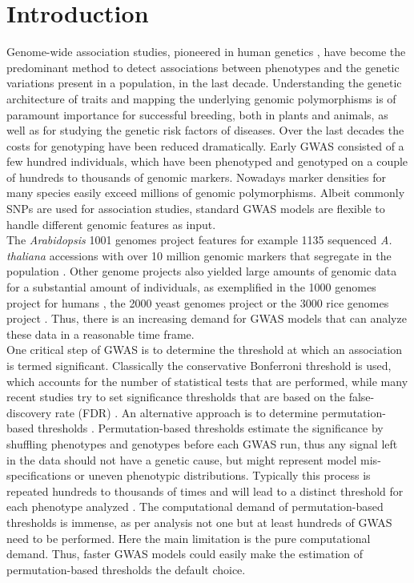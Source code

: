 \section{Introduction}
Genome-wide association studies, pioneered in human genetics \cite{Hirschhorn2005}, have
become the predominant method to detect associations between phenotypes and the genetic
variations present in a population, in the last decade. Understanding the genetic
architecture of traits and mapping the underlying genomic polymorphisms is of paramount
importance for successful breeding, both in plants and animals, as well as for studying
the genetic risk factors of diseases. Over the last decades the costs for genotyping have
been reduced dramatically. Early GWAS consisted of a few hundred individuals, which have
been phenotyped and genotyped on a couple of hundreds to thousands of genomic
markers. Nowadays marker densities for many species easily exceed millions of genomic
polymorphisms. Albeit commonly SNPs are used for association studies, standard GWAS models
are flexible to handle different genomic features as input. \\
The \textit{Arabidopsis} 1001 genomes project features for example 1135 sequenced
\textit{A. thaliana} accessions with over 10 million genomic markers that segregate in the
population \cite{1001genome}. Other genome projects also yielded large amounts of genomic
data for a substantial amount of individuals, as exemplified in the 1000 genomes project
for humans \cite{1000genome}, the 2000 yeast genomes project or the 3000 rice genomes
project \cite{3000genome}. Thus, there is an increasing demand for GWAS
models that can analyze these data in a reasonable time frame.\\
One critical step of GWAS is to determine the threshold at which an association is termed
significant. Classically the conservative Bonferroni threshold is used, which accounts for
the number of statistical tests that are performed, while many recent studies try to set
significance thresholds that are based on the false-discovery rate (FDR)
\cite{Storey9440}. An alternative approach is to determine permutation-based thresholds
\cite{che2014adaptive}. Permutation-based thresholds estimate the significance by
shuffling phenotypes and genotypes before each GWAS run, thus any signal left in the data
should not have a genetic cause, but might represent model mis-specifications or uneven
phenotypic distributions. Typically this process is repeated hundreds to thousands of
times and will lead to a distinct threshold for each phenotype analyzed
\cite{togninalli2017aragwas}. The computational demand of permutation-based thresholds is
immense, as per analysis not one but at least hundreds of GWAS need to be performed. Here
the main limitation is the pure computational demand. Thus, faster GWAS models could
easily make the estimation of permutation-based thresholds the default choice.

